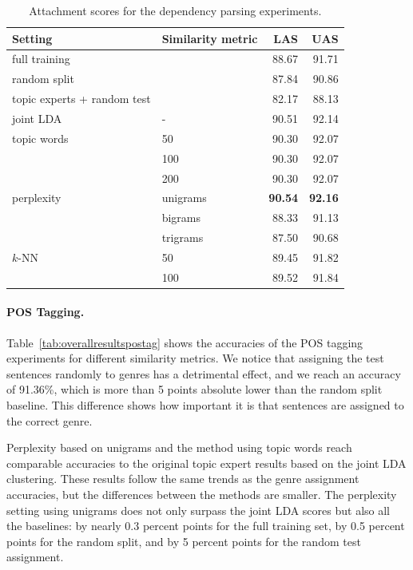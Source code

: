   \begin{table}[t!]
\centering
\begin{tabular}{l|l|rr|}
Setting &Similarity metric & LAS &UAS \\ \hline
full training & & 88.67 & 91.71 \\ 
random split &  & 87.84 & 90.86 \\ 
topic experts + random test &  & 82.17 & 88.13 \\ \hline
joint LDA & -& 90.51 & 92.14 \\ \hline
topic words & 50 & 90.30 & 92.07 \\
 & 100 & 90.30 & 92.07 \\
 & 200 & 90.30 & 92.07 \\ \hline
perplexity & unigrams & \textbf{90.54} & \textbf{92.16} \\
 & bigrams & 88.33 & 91.13 \\
 & trigrams & 87.50 & 90.68 \\ \hline
$k$-NN  &50 & 89.45 & 91.82 \\
 & 100 & 89.52 & 91.84 \\ \hline
\end{tabular}
\caption{Attachment scores for the dependency parsing experiments.}
\label{tab:overallresultsdep}
\end{table}


  
\paragraph{POS Tagging.}
Table~\ref{tab:overallresultspostag} shows the accuracies of the POS tagging experiments for different similarity metrics. We notice that assigning the test sentences randomly to genres has a detrimental effect, and we reach an accuracy of 91.36\%, which is more than 5 points absolute lower than the random split baseline. This difference shows how important it is that sentences are assigned to the correct genre.
 
Perplexity based on unigrams and the method using topic words reach comparable accuracies to the original topic expert results based on the joint LDA clustering. These results follow the same trends as the genre assignment accuracies, but the differences between the methods are smaller. The perplexity setting using unigrams does not only surpass the joint LDA scores but also all the baselines: by nearly 0.3 percent points for the full training set, by 0.5 percent points  for the random split, and by 5 percent points  for the random test assignment.

